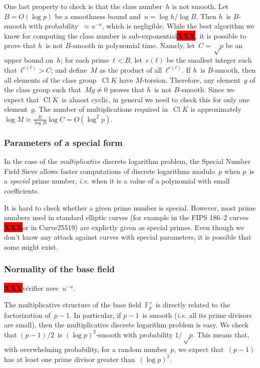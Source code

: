 \documentclass{article}
\def\F{\mathbb{F}}
\def\pa#1{\left(#1\right)}
\DeclareMathOperator\Cl{Cl}
\def\XXX{{\colorbox{red}{{\color{white}\bfseries XXX}}}}
\begin{document}
\medbreak

One last property to check is that the class number~$h$ is not smooth.
Let~$B = O(\log p)$ be a smoothness bound and~$u = \log h / \log B$.
Then $h$~is $B$-smooth with probability~$≈ u^{-u}$,
which is negligible.
While the best algorithm we know for computing the class number
is sub-exponential\XXX,
it is possible to prove that $h$~is not $B$-smooth in polynomial time.
Namely, let~$C = √p$ be an upper bound on~$h$;
for each prime~$ℓ < B$, let~$e(ℓ)$ be the smallest integer
such that~$ℓ^{e(ℓ)} > C$;
and define~$M$ as the product of all~$ℓ^{e(ℓ)}$.
If $h$~is $B$-smooth, then all elements of the class group~$\Cl K$
have $M$-torsion.
Therefore, any element~$g$ of the class group such that~$M g ≠ 0$
proves that $h$~is not $B$-smooth.
Since we expect that $\Cl K$~is almost cyclic,
in general we need to check this for only one element~$g$.
The number of multiplications required in~$\Cl K$
is approximately~$\log M ≈ \frac{B}{\log B} \log C = O(\log^2 p)$.


\subsubsection{Parameters of a special form}
\label{sss:special-prime}

In the case of the \emph{multiplicative} discrete logarithm problem,
the Special Number Field Sieve allows faster computations
of discrete logarithms modulo~$p$
when $p$~is a \emph{special} prime number,
\emph{i.e.} when it is a value of a polynomial with small coefficients.

It is hard to check whether a given prime number is special.
However, most prime numbers used in standard elliptic curves
(for example in the FIPS 186--2 curves \XXX or in Curve25519)
are explictly given as special primes.
Even though we don't know any attack against curves with special parameters,
it is possible that some might exist.

\subsubsection{Normality of the base field}

\XXX vérifier avec~$u^{-u}$.

The multiplicative structure of the base field~$\F_p^{×}$
is directly related to the factorization of~$p-1$.
In particular, if $p-1$~is smooth
(\emph{i.e.} all its prime divisors are small),
then the multiplicative discrete logarithm problem is easy.
We check~\cite{jnt1983cep} that
$(p-1)/2$~is $\pa{\log p}^2$-smooth with probability $1/√p$.
This means that, with overwhelming probability,
for a random number~$p$, we expect that~$(p-1)$
has at least one prime divisor greater than~$(\log p)^2$.
\end{document}

